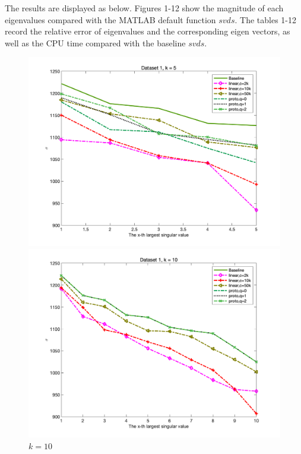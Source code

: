 \documentclass{article}
\begin{document}
The results are displayed as below. Figures 1-12 show the magnitude of each eigenvalues compared with the MATLAB default function $svds$. The tables 1-12 record the relative error of eigenvalues and the corresponding eigen vectors, as well as the CPU time compared with the baseline $svds$.
\begin{figure}[p]
	\begin{minipage}{0.54\linewidth}
		\centering
		\includegraphics[width=1\linewidth]{./fig/dataset1_5.png}
		\caption{$k=5$}
	\end{minipage}
	\begin{minipage}{0.54\linewidth}
		\centering
		\includegraphics[width=1\linewidth]{./fig/dataset1_10.png}
		\caption{$k=10$}
	\end{minipage}
\end{figure} 
\end{document}
